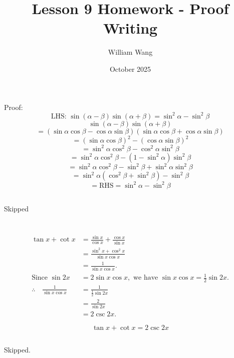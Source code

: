 \documentclass{article}
\title{Lesson 9 Homework - Proof Writing}
\author{William Wang}
\date{October 2025}
\begin{document}
\maketitle

\section{}
\subsection{}
Proof:
\[ \text{LHS: }\sin(\alpha - \beta)\sin(\alpha + \beta) = \sin^2 \alpha - \sin^2 \beta \]
 \[\sin(\alpha - \beta)\sin(\alpha + \beta) \]
\[=(\sin\alpha\cos\beta - \cos\alpha\sin\beta)(\sin\alpha\cos\beta + \cos\alpha\sin\beta) \]
\[= (\sin\alpha\cos\beta)^2 - (\cos\alpha\sin\beta)^2 \]
\[= \sin^2\alpha\cos^2\beta - \cos^2\alpha\sin^2\beta \]
\[= \sin^2\alpha\cos^2\beta - (1 - \sin^2\alpha)\sin^2\beta \]
\[= \sin^2\alpha\cos^2\beta - \sin^2\beta + \sin^2\alpha\sin^2\beta \]
\[= \sin^2\alpha(\cos^2\beta + \sin^2\beta) - \sin^2\beta \]
\[= \text{RHS}=\sin^2\alpha - \sin^2\beta\]

\subsection{}
Skipped
\section{}
\subsection{}
\[
\begin{aligned}
\tan x + \cot x 
&= \frac{\sin x}{\cos x} + \frac{\cos x}{\sin x} \\[6pt]
&= \frac{\sin^2 x + \cos^2 x}{\sin x \cos x} \\[6pt]
&= \frac{1}{\sin x \cos x}. \\[10pt]
\text{Since } \sin 2x &= 2 \sin x \cos x, \text{ we have } \sin x \cos x = \frac{1}{2} \sin 2x. \\[6pt]
\therefore \quad \frac{1}{\sin x \cos x} 
&= \frac{1}{\tfrac{1}{2} \sin 2x} \\[6pt]
&= \frac{2}{\sin 2x} \\[6pt]
&= 2 \csc 2x.
\end{aligned}
\]

\[
\boxed{\tan x + \cot x = 2 \csc 2x}
\]
\subsection{}
Skipped.
\end{document}
